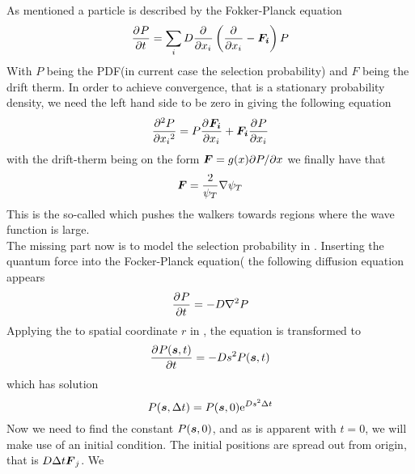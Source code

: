         As mentioned a particle is described by the Fokker-Planck equation
            \begin{equation}
                \FokkerPlanck
                \label{eq:FokkerPlanckDef}
            \end{equation}
        With $P$ being the PDF(in current case the selection probability) and
        $F$ being the drift therm. In order to achieve convergence, that is a
        stationary probability density, we need the left hand side to be zero
        in  giving the following equation
            \begin{equation}
                \prd{x_i}[P][2] = P\prd{x_i}[\mb{F_i}] + \mb{F_i}\prd{x_i}[P]
            \end{equation}
        with the drift-therm being on the form $\boldsymbol{{F}}=g(x)\mathrm{\partial} P/\mathrm{\partial} x$ we
        finally have that
            \begin{equation}
                \boldsymbol{{F}} = \frac{2}{\psi_T}\nabla \psi_T
                \label{eq:qForceDef}
            \end{equation}
        This is the so-called  which pushes the walkers
        towards regions where the wave function is large. \\
        The missing part now is to model the selection probability in
        . Inserting the quantum force into the
        Focker-Planck equation( the following diffusion
        equation appears
            \begin{equation}
                \prd{t}[P] = -D\nabla^2 P
                \label{eq:diffeqFP}
            \end{equation}
        Applying the  to spatial coordinate $r$ in
        , the equation is transformed to
            \begin{equation}
                \prd{t}[P(\blds{s},t)] = -Ds^2 P(\blds{s},t)
            \end{equation}
        which has solution
            \begin{equation}
                P(\boldsymbol{{s}},\Delta t) = P(\boldsymbol{{s}},0)\mathrm{e}^{Ds^2\Delta t}
                \label{eq:Punfin}
            \end{equation}
        Now we need to find the constant $P(\boldsymbol{{s}},0)$, and as is apparent
        with $t=0$, we will make use of an initial condition. The initial
        positions are spread out from origin, that is $D\Delta t\boldsymbol{{F}}_j$. We
